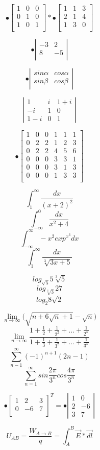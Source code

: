 \documentclass[12pt, letterpaper, titlepage]{article}
\begin{document}
$$ \mathbf{•}
\left[\begin{array}{ccc}
1 & 0 & 0 \\
0 & 1 & 0 \\
1 & 0 & 1 \\
\end{array} \right] * 
\mathbf{•}
\left[\begin{array}{ccc}
1 & 1 & 3 \\
2 & 1 & 4 \\
1 & 3 & 0 \\
\end{array} \right]
$$

$$
\mathbf{•}
\left|\begin{array}{cc}
-3 & 2 \\
8 & -5 \\
\end{array} \right|
$$

$$
\mathbf{•}
\left|\begin{array}{cc}
sin\alpha & cos\alpha \\
sin\beta & cos\beta \\
\end{array} \right|
$$

$$
\left|
\begin{array}{ccc}
1 & i & 1+i \\
-i & 1 & 0 \\
1-i & 0 & 1 
\end{array} 
\right|
$$

$$
\mathbf{•}
\left[
\begin{array}{c|cc|ccc}
1 & 0 & 0 & 1 & 1 & 1 \\
\hline
0 & 2 & 2 & 1 & 2 & 3 \\
0 & 2 & 2 & 4 & 5 & 6 \\
\hline 
0 & 0 & 0 & 3 & 3 & 1 \\
0 & 0 & 0 & 3 & 1 & 3 \\
0 & 0 & 0 & 1 & 3 & 3 \\
\end{array}
\right]
$$

$$
\int_{1}^{\infty} \frac{dx}{(x+2)^2}
$$
$$
\int_{-\infty}^{0} \frac{dx}{x^2+4}
$$
$$
\int_{-\infty}^{\infty} -x^2 exp^{x^3}dx
$$
$$
\int_{1}^{\infty} \frac{dx}{\sqrt[3]{3x+5}}
$$

$$ log_{\sqrt{5}}{5\sqrt[3]{5}} $$
$$ log_{\sqrt[3]{3}}{27} $$
$$ log_{2}{8\sqrt{2}} $$

$$ \lim_{n\to\infty} \Biggl(\sqrt{n+6\sqrt{n}+1}-\sqrt{n}\Biggr) $$
$$ \lim_{n\to\infty} \frac{1+\frac{1}{2}+\frac{1}{2^2}+ ...+\frac{1}{2^n}}{1+\frac{1}{3}+\frac{1}{3^2}+ ...+\frac{1}{3^n}}$$
$$ \sum_{n-1}^{\infty} (-1)^{n+1} (2n-1)$$
$$ \sum_{n=1}^{\infty} sin \frac{2\pi}{3^n}cos\frac{4\pi}{3^n} $$

$$
{\mathbf{•}
\left[\begin{array}{ccc}
1 & 2 & 3\\
0 & -6 & 7\\
\end{array} \right]}^T =
\mathbf{•}
\left|\begin{array}{cc}
1 & 0 \\
2 & -6 \\
3 & 7 
\end{array} \right|
$$

$$
U_{AB}= \frac{W_{A \rightarrow B}}{q} = \int_{A}^{B} \vec{E} *\vec{dl}
$$
\end{document}
